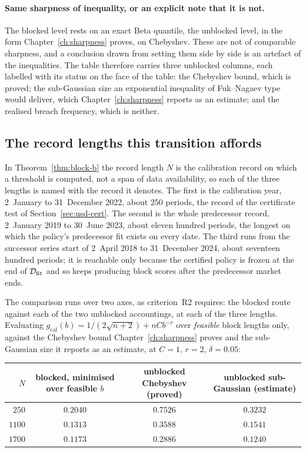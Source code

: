 \documentclass[../../../main.tex]{subfiles}
\begin{document}
\paragraph{Same sharpness of inequality, or an explicit note that it is not.} The blocked level rests on an exact Beta quantile, the unblocked level, in the form Chapter~\ref{ch:sharpness} proves, on Chebyshev. These are not of comparable sharpness, and a conclusion drawn from setting them side by side is an artefact of the inequalities. The table therefore carries three unblocked columns, each labelled with its status on the face of the table: the Chebyshev bound, which is proved; the sub-Gaussian size an exponential inequality of Fuk--Nagaev type would deliver, which Chapter~\ref{ch:sharpness} reports as an estimate; and the realised breach frequency, which is neither.

\subsection{The record lengths this transition affords}

In Theorem~\ref{thm:block-b} the record length $N$ is the calibration record on which a threshold is computed, not a span of data availability, so each of the three lengths is named with the record it denotes. The first is the calibration year, 2~January to 31~December 2022, about $250$ periods, the record of the certificate test of Section~\ref{sec:usd-cert}. The second is the whole predecessor record, 2~January 2019 to 30~June 2023, about eleven hundred periods, the longest on which the policy's predecessor fit exists on every date. The third runs from the successor series start of 2~April 2018 to 31~December 2024, about seventeen hundred periods; it is reachable only because the certified policy is frozen at the end of $\mathcal D_{\mathrm{fit}}$ and so keeps producing block scores after the predecessor market ends.

The comparison runs over two axes, as criterion~R2 requires: the blocked route against each of the two unblocked accountings, at each of the three lengths. Evaluating $g_{\mathrm{cal}}(b)=1/(2\sqrt{n+2})+nCb^{-r}$ over \emph{feasible} block lengths only, against the Chebyshev bound Chapter~\ref{ch:sharpness} proves and the sub-Gaussian size it reports as an estimate, at $C=1$, $r=2$, $\delta=0.05$:

\begin{center}\small
\begin{tabular}{@{}rccc@{}}
\toprule
$N$ & blocked, minimised over feasible $b$ & unblocked Chebyshev (proved) & unblocked sub-Gaussian (estimate) \\
\midrule
$250$ & $0.2040$ & $0.7526$ & $0.3232$ \\
$1100$ & $0.1313$ & $0.3588$ & $0.1541$ \\
$1700$ & $0.1173$ & $0.2886$ & $0.1240$ \\
\bottomrule
\end{tabular}
\end{center}
\end{document}
